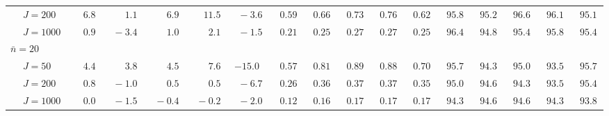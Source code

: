 \begin{sidewaystable}
\begin{threeparttable}
\begin{tabular}{llccccccccccccccc}
 & \nopagebreak $\;J=200$  & $\phantom{0}\phantom{-}6.8\phantom{0}$ & $\phantom{0}\phantom{-}1.1\phantom{0}$ & $\phantom{0}\phantom{-}6.9\phantom{0}$ & $\phantom{-}11.5\phantom{0}$ & $\phantom{0}{-}3.6\phantom{0}$ & $\phantom{0}0.59\phantom{0}$ & $\phantom{0}0.66\phantom{0}$ & $\phantom{0}0.73\phantom{0}$ & $\phantom{0}0.76\phantom{0}$ & $\phantom{0}0.62\phantom{0}$ & $\phantom{0}95.8\phantom{0}$ & $\phantom{0}95.2\phantom{0}$ & $\phantom{0}96.6\phantom{0}$ & $\phantom{0}96.1\phantom{0}$ & $\phantom{0}95.1\phantom{0}$ \\
 & \nopagebreak $\;J=1000$  & $\phantom{0}\phantom{-}0.9\phantom{0}$ & $\phantom{0}{-}3.4\phantom{0}$ & $\phantom{0}\phantom{-}1.0\phantom{0}$ & $\phantom{0}\phantom{-}2.1\phantom{0}$ & $\phantom{0}{-}1.5\phantom{0}$ & $\phantom{0}0.21\phantom{0}$ & $\phantom{0}0.25\phantom{0}$ & $\phantom{0}0.27\phantom{0}$ & $\phantom{0}0.27\phantom{0}$ & $\phantom{0}0.25\phantom{0}$ & $\phantom{0}96.4\phantom{0}$ & $\phantom{0}94.8\phantom{0}$ & $\phantom{0}95.4\phantom{0}$ & $\phantom{0}95.8\phantom{0}$ & $\phantom{0}95.4\phantom{0}$ \\
\multicolumn{4}{l}{$\bar{n}=20$} \\  & \nopagebreak $\;J=50$  & $\phantom{0}\phantom{-}4.4\phantom{0}$ & $\phantom{0}\phantom{-}3.8\phantom{0}$ & $\phantom{0}\phantom{-}4.5\phantom{0}$ & $\phantom{0}\phantom{-}7.6\phantom{0}$ & ${-}15.0\phantom{0}$ & $\phantom{0}0.57\phantom{0}$ & $\phantom{0}0.81\phantom{0}$ & $\phantom{0}0.89\phantom{0}$ & $\phantom{0}0.88\phantom{0}$ & $\phantom{0}0.70\phantom{0}$ & $\phantom{0}95.7\phantom{0}$ & $\phantom{0}94.3\phantom{0}$ & $\phantom{0}95.0\phantom{0}$ & $\phantom{0}93.5\phantom{0}$ & $\phantom{0}95.7\phantom{0}$ \\
 & \nopagebreak $\;J=200$  & $\phantom{0}\phantom{-}0.8\phantom{0}$ & $\phantom{0}{-}1.0\phantom{0}$ & $\phantom{0}\phantom{-}0.5\phantom{0}$ & $\phantom{0}\phantom{-}0.5\phantom{0}$ & $\phantom{0}{-}6.7\phantom{0}$ & $\phantom{0}0.26\phantom{0}$ & $\phantom{0}0.36\phantom{0}$ & $\phantom{0}0.37\phantom{0}$ & $\phantom{0}0.37\phantom{0}$ & $\phantom{0}0.35\phantom{0}$ & $\phantom{0}95.0\phantom{0}$ & $\phantom{0}94.6\phantom{0}$ & $\phantom{0}94.3\phantom{0}$ & $\phantom{0}93.5\phantom{0}$ & $\phantom{0}95.4\phantom{0}$ \\
 & \nopagebreak $\;J=1000$  & $\phantom{0}\phantom{-}0.0\phantom{0}$ & $\phantom{0}{-}1.5\phantom{0}$ & $\phantom{0}{-}0.4\phantom{0}$ & $\phantom{0}{-}0.2\phantom{0}$ & $\phantom{0}{-}2.0\phantom{0}$ & $\phantom{0}0.12\phantom{0}$ & $\phantom{0}0.16\phantom{0}$ & $\phantom{0}0.17\phantom{0}$ & $\phantom{0}0.17\phantom{0}$ & $\phantom{0}0.17\phantom{0}$ & $\phantom{0}94.3\phantom{0}$ & $\phantom{0}94.6\phantom{0}$ & $\phantom{0}94.6\phantom{0}$ & $\phantom{0}94.3\phantom{0}$ & $\phantom{0}93.8\phantom{0}$ \\

\end{tabular}
\end{threeparttable}
\end{sidewaystable}
